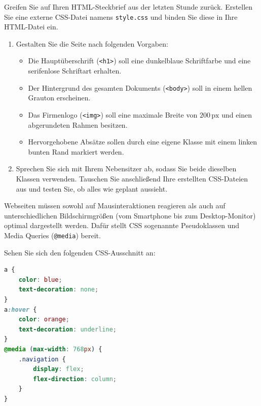 \documentclass[11pt, a4paper, oneside]{article}
\begin{document}
	\lines[4cm]
	
	
	
	Greifen Sie auf Ihren HTML-Steckbrief aus der letzten Stunde zurück.
	Erstellen Sie eine externe CSS-Datei namens \texttt{style.css} und binden Sie diese in Ihre HTML-Datei ein.
	
	\begin{enumerate}[label=\alph*)]
		\item Gestalten Sie die Seite nach folgenden Vorgaben:
		\begin{itemize}
			\item Die Hauptüberschrift (\texttt{<h1>}) soll eine dunkelblaue Schriftfarbe und eine serifenlose Schriftart erhalten.
			\item Der Hintergrund des gesamten Dokuments (\texttt{<body>}) soll in einem hellen Grauton erscheinen.
			\item Das Firmenlogo (\texttt{<img>}) soll eine maximale Breite von $200\,\text{px}$ und einen abgerundeten Rahmen besitzen.
			\item Hervorgehobene Absätze sollen durch eine eigene Klasse mit einem linken bunten Rand markiert werden.
		\end{itemize}
		\item Sprechen Sie sich mit Ihrem Nebensitzer ab, sodass Sie beide dieselben Klassen verwenden.
		Tauschen Sie anschließend Ihre erstellten CSS-Dateien aus und testen Sie, ob alles wie geplant aussieht.
	\end{enumerate}
	
	
	
	Webseiten müssen sowohl auf Mausinteraktionen reagieren als auch auf unterschiedlichen Bildschirmgrößen (vom Smartphone bis zum Desktop-Monitor) optimal dargestellt werden.
	Dafür stellt CSS sogenannte Pseudoklassen und Media Queries (\texttt{@media}) bereit.
	
	Sehen Sie sich den folgenden CSS-Ausschnitt an:
	
	\begin{lstlisting}[language=CSS]
a {
	color: blue;
	text-decoration: none;
}
a:hover {
	color: orange;
	text-decoration: underline;
}
@media (max-width: 768px) {
	.navigation {
		display: flex;
		flex-direction: column;
	}
}
	\end{lstlisting}
	
\end{document}
